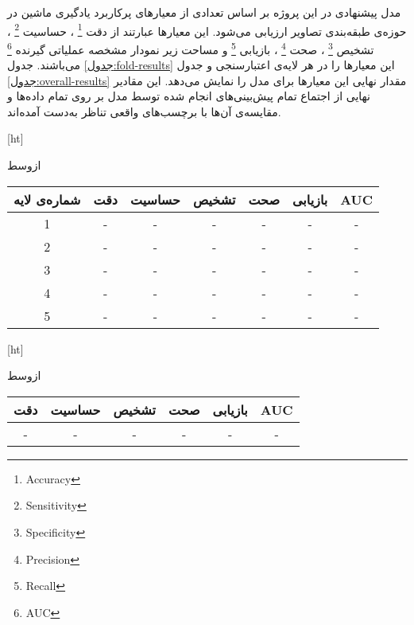 


مدل پیشنهادی در این پروژه بر اساس تعدادی از معیار‌های پرکاربرد یادگیری ماشین  
در حوزه‌ی طبقه‌بندی تصاویر 
ارزیابی می‌شود.
این معیارها عبارتند از دقت
\footnote{Accuracy}
،
حساسیت
\footnote{Sensitivity}
،
تشخیص
\footnote{Specificity}
،
صحت
\footnote{Precision}
،
بازیابی
\footnote{Recall}
و 
مساحت زیر نمودار مشخصه عملیاتی گیرنده
\footnote{AUC}
می‌باشند.
جدول \ref{جدول:fold-results}
این معیار‌ها را در هر لایه‌ی اعتبارسنجی و جدول 
\ref{جدول:overall-results}
مقدار نهایی این معیار‌ها برای مدل را نمایش می‌دهد.
این مقادیر نهایی از اجتماع تمام پیش‌بینی‌های انجام شده توسط مدل بر روی تمام داده‌ها و مقایسه‌ی آن‌ها با برچسب‌های واقعی تناظر به‌دست آمده‌اند.

[ht]

\vspace{1.5em}

‌ازوسط

\begin{tabular}{ccccccc}
    \hline
     
    شماره‌ی لایه & دقت & حساسیت & تشخیص & صحت & بازیابی & AUC \\ \hline
    1                                    & -                           & -      & -     & -   & -       & -   \\ 
    2                                    & -                           & -      & -     & -   & -       & -   \\ 
    3                                    & -                           & -      & -     & -   & -       & -   \\ 
    4                                    & -                           & -      & -     & -   & -       & -   \\ 
    5                                    & -                           & -      & -     & -   & -       & -   \\ \hline
    \end{tabular}


[ht]

\vspace{1.5em}

‌ازوسط

\begin{tabular}{cccccc}
    \hline
     
    دقت & حساسیت & تشخیص & صحت & بازیابی & AUC \\ \hline
    -                           & -      & -     & -   & -       & -   \\ \hline
    \end{tabular}

